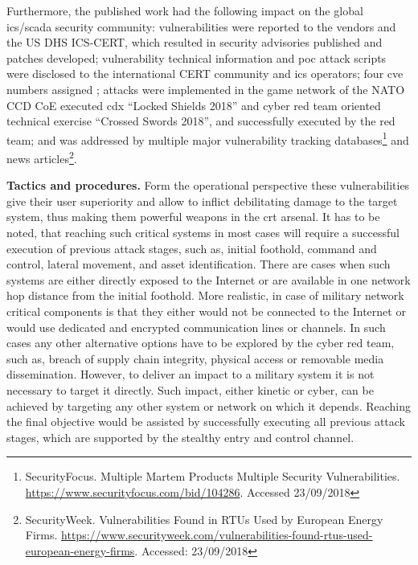 Furthermore, the published work had the following impact on the global \gls{ics}/\gls{scada} security community:
vulnerabilities were reported to the vendors and the US DHS ICS-CERT, which resulted in security advisories published \cite{ICS-CERT2018} \cite{MartemGWSmanual} and patches developed;
vulnerability technical information and \gls{poc} attack scripts were disclosed to the international CERT community and \gls{ics} operators;
four \gls{cve} numbers assigned \cite{CVE-2018-10603} \cite{CVE-2018-10605} \cite{CVE-2018-10607} \cite{CVE-2018-10609};
attacks were implemented in the game network of the NATO CCD CoE executed \gls{cdx} ``Locked Shields 2018'' and cyber red team oriented technical exercise ``Crossed Swords 2018'', and successfully executed by the red team;
and was addressed by multiple major vulnerability tracking databases\footnote{SecurityFocus. Multiple Martem Products Multiple Security Vulnerabilities. \url{https://www.securityfocus.com/bid/104286}. Accessed 23/09/2018} and news articles\footnote{SecurityWeek. Vulnerabilities Found in RTUs Used by European Energy Firms. \url{https://www.securityweek.com/vulnerabilities-found-rtus-used-european-energy-firms}. Accessed: 23/09/2018}.

\textbf{Tactics and procedures.}
Form the operational perspective these vulnerabilities give their user superiority and allow to inflict debilitating damage to the target system, thus making them powerful weapons in the \gls{crt} arsenal.
It has to be noted, that reaching such critical systems in most cases will require a successful execution of previous attack stages, such as, initial foothold, command and control, lateral movement, and asset identification. There are cases when such systems are either directly exposed to the Internet or are available in one network hop distance from the initial foothold. More realistic, in case of military network critical components is that they either would not be connected to the Internet or would use dedicated and encrypted communication lines or channels. In such cases any other alternative options have to be explored by the cyber red team, such as, breach of supply chain integrity, physical access or removable media dissemination. However, to deliver an impact to a military system it is not necessary to target it directly. Such impact, either kinetic or cyber, can be achieved by targeting any other system or network on which it depends. Reaching the final objective would be assisted by successfully executing all previous attack stages, which are supported by the stealthy entry and control channel.

